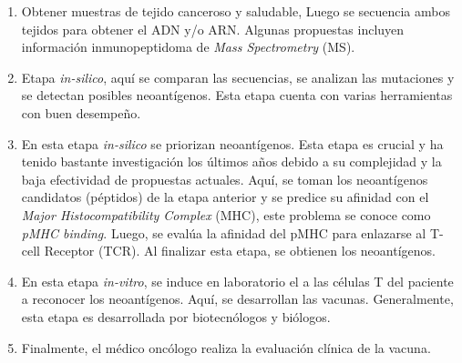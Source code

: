 \documentclass[a4paper]{article}
\begin{document}
	
	\begin{enumerate}
		\item Obtener muestras de tejido canceroso y saludable, Luego se secuencia ambos tejidos para obtener el ADN y/o ARN. Algunas propuestas incluyen información inmunopeptidoma de \textit{Mass Spectrometry} (MS).
		\item Etapa \textit{in-silico}, aquí  se comparan las secuencias, se analizan las mutaciones y se detectan posibles neoantígenos. Esta etapa cuenta con varias herramientas con buen desempeño.
		\item En esta etapa \textit{in-silico} se priorizan neoantígenos. Esta etapa es crucial y ha tenido bastante investigación los últimos años debido a su complejidad y la baja efectividad de propuestas actuales. Aquí, se toman los neoantígenos candidatos (péptidos) de la etapa anterior y se predice su afinidad con el \textit{Major Histocompatibility Complex} (MHC), este problema se conoce como \textit{pMHC binding}. Luego, se  evalúa la afinidad del pMHC para enlazarse al T-cell Receptor (TCR). Al finalizar esta etapa, se obtienen los neoantígenos.
		\item En esta etapa \textit{in-vitro}, se induce en laboratorio el a las células T del paciente a reconocer los neoantígenos. Aquí, se desarrollan las vacunas. Generalmente, esta etapa es desarrollada por biotecnólogos y biólogos.
		\item Finalmente, el médico oncólogo realiza la evaluación clínica de la vacuna.
	\end{enumerate}
	
	
	
	
	
	
	
\end{document}
